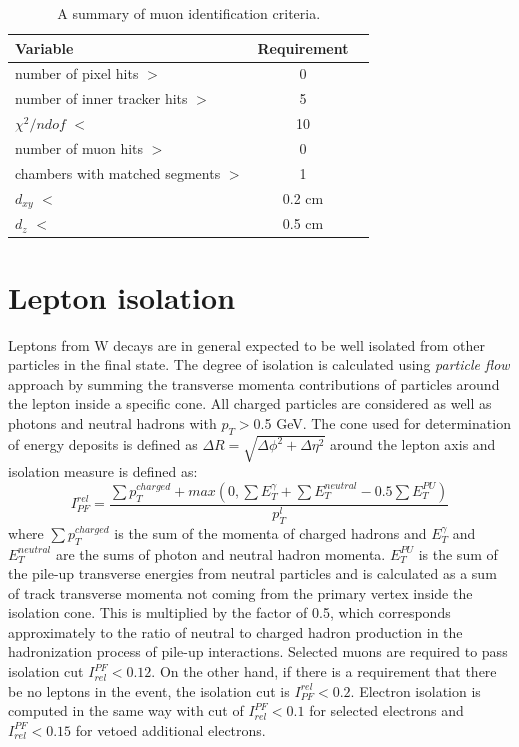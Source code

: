   \begin{table}[h]
\centering
  \caption{A summary of muon identification criteria.}
  \label{tab:muID}
  \begin{tabular}{ l  c c}
      \hline
      \hline
      	Variable & Requirement \\
      	\hline
    		number of pixel hits $>$ &  0 \\
     	number of inner tracker hits $>$ &  5 \\
     	$\chi^2/ndof$ $<$ & 10 \\
		number of muon hits $>$ & 0  \\
		chambers with matched segments $>$ & 1  \\		
		$d_{xy}$ $<$ & 0.2 cm \\
		$d_{z}$ $<$  & 0.5 cm \\
      \hline
      \hline 
  \end{tabular}
\end{table}
 


\section{Lepton isolation}
Leptons from W decays are in general expected to be well isolated from other particles in the final state. The degree of isolation is calculated using \textit{particle flow} approach by summing the transverse momenta contributions of particles around the lepton inside a specific cone. All charged particles are considered as well as photons and neutral hadrons with $p_T>$0.5 GeV. The cone used for determination of energy deposits is defined as $\Delta R = \sqrt{\Delta \phi^2+ \Delta \eta^2}$ around the lepton axis and isolation measure is defined as:
\begin{equation}
I_{PF}^{rel} = \frac{\sum p_T^{charged} + max(0, \sum E_T^{\gamma}+\sum E_T^{neutral}-0.5\sum E_T^{PU})}{p_T^l}
\end{equation}
where $\sum p_T^{charged}$ is the sum of the momenta of charged hadrons and $E_T^{\gamma} $ and $E_T^{neutral}$ are the sums of photon and neutral hadron momenta. $E_T^{PU}$ is the sum of the pile-up transverse energies from neutral particles and is calculated as a sum of track transverse momenta not coming from the primary vertex inside the isolation cone. This is multiplied by the factor of 0.5, which corresponds approximately to the ratio of neutral to charged hadron production in the hadronization process of pile-up interactions. Selected muons are required to pass isolation cut $I_{rel}^{PF}<0.12$. On the other hand, if there is a requirement that there be no leptons in the event, the isolation cut is $I_{PF}^{rel}<0.2$. Electron isolation is computed in the same way with cut of $I_{rel}^{PF}<0.1$ for selected electrons and $I_{rel}^{PF}<0.15$ for vetoed additional electrons.


